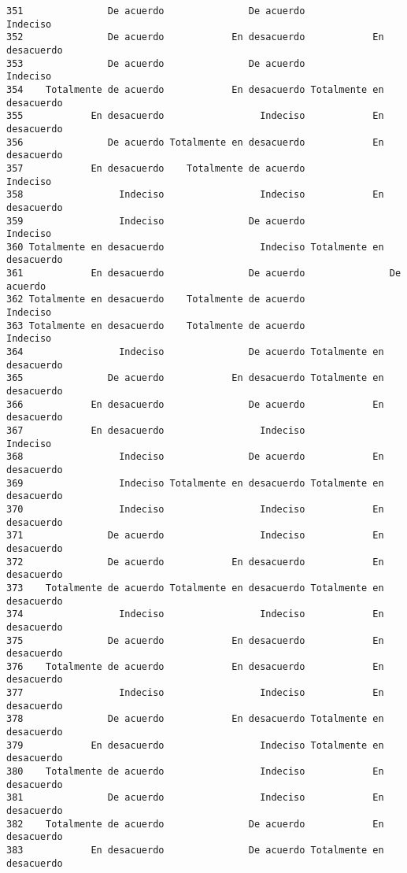 \documentclass[
  letterpaper,
  DIV=11,
  numbers=noendperiod]{scrartcl}
\begin{document}
\begin{verbatim}
351               De acuerdo               De acuerdo                 Indeciso
352               De acuerdo            En desacuerdo            En desacuerdo
353               De acuerdo               De acuerdo                 Indeciso
354    Totalmente de acuerdo            En desacuerdo Totalmente en desacuerdo
355            En desacuerdo                 Indeciso            En desacuerdo
356               De acuerdo Totalmente en desacuerdo            En desacuerdo
357            En desacuerdo    Totalmente de acuerdo                 Indeciso
358                 Indeciso                 Indeciso            En desacuerdo
359                 Indeciso               De acuerdo                 Indeciso
360 Totalmente en desacuerdo                 Indeciso Totalmente en desacuerdo
361            En desacuerdo               De acuerdo               De acuerdo
362 Totalmente en desacuerdo    Totalmente de acuerdo                 Indeciso
363 Totalmente en desacuerdo    Totalmente de acuerdo                 Indeciso
364                 Indeciso               De acuerdo Totalmente en desacuerdo
365               De acuerdo            En desacuerdo Totalmente en desacuerdo
366            En desacuerdo               De acuerdo            En desacuerdo
367            En desacuerdo                 Indeciso                 Indeciso
368                 Indeciso               De acuerdo            En desacuerdo
369                 Indeciso Totalmente en desacuerdo Totalmente en desacuerdo
370                 Indeciso                 Indeciso            En desacuerdo
371               De acuerdo                 Indeciso            En desacuerdo
372               De acuerdo            En desacuerdo            En desacuerdo
373    Totalmente de acuerdo Totalmente en desacuerdo Totalmente en desacuerdo
374                 Indeciso                 Indeciso            En desacuerdo
375               De acuerdo            En desacuerdo            En desacuerdo
376    Totalmente de acuerdo            En desacuerdo            En desacuerdo
377                 Indeciso                 Indeciso            En desacuerdo
378               De acuerdo            En desacuerdo Totalmente en desacuerdo
379            En desacuerdo                 Indeciso Totalmente en desacuerdo
380    Totalmente de acuerdo                 Indeciso            En desacuerdo
381               De acuerdo                 Indeciso            En desacuerdo
382    Totalmente de acuerdo               De acuerdo            En desacuerdo
383            En desacuerdo               De acuerdo Totalmente en desacuerdo

\end{verbatim}
\end{document}
